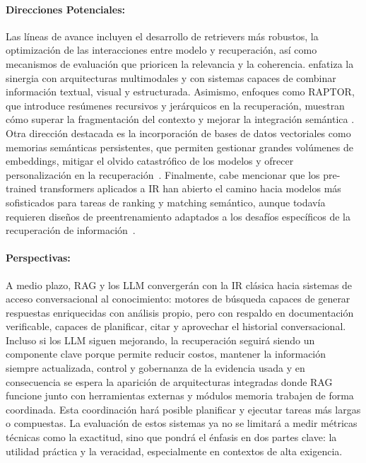 \paragraph{Direcciones Potenciales:}  
Las líneas de avance incluyen el desarrollo de retrievers más robustos, la optimización de las interacciones entre modelo y recuperación, 
así como mecanismos de evaluación que prioricen la relevancia y la coherencia. \textcite{ramdurai2025llm} enfatiza la sinergia con arquitecturas multimodales y con sistemas 
capaces de combinar información textual, visual y estructurada. Asimismo, enfoques como RAPTOR, que introduce resúmenes recursivos y jerárquicos en la recuperación,
muestran cómo superar la fragmentación del contexto y mejorar la integración semántica \parencite{sarthi2024raptor}. Otra dirección destacada es la incorporación de 
bases de datos vectoriales como memorias semánticas persistentes, que permiten gestionar grandes volúmenes de embeddings, mitigar el olvido catastrófico de los modelos
 y ofrecer personalización en la recuperación~\parencite{jing2024vecdb}.
Finalmente, cabe mencionar que los pre-trained transformers aplicados a IR han abierto el camino hacia modelos más sofisticados para tareas de ranking y matching semántico, 
aunque todavía requieren diseños de preentrenamiento adaptados a los desafíos específicos de la recuperación de información~\parencite{fan2021pretraining}.

\paragraph{Perspectivas:}
A medio plazo, RAG y los LLM convergerán con la IR clásica hacia sistemas de acceso conversacional al conocimiento: motores de búsqueda capaces de generar respuestas enriquecidas con análisis propio,
pero con respaldo en documentación verificable, capaces de planificar, citar y aprovechar el historial conversacional. Incluso si los LLM siguen mejorando, la recuperación seguirá 
siendo un componente clave porque permite reducir costos, mantener la información siempre actualizada, control y gobernanza de la evidencia usada y en consecuencia se espera la aparición de arquitecturas integradas donde RAG funcione junto con
herramientas externas y módulos memoria trabajen de forma coordinada. Esta coordinación hará posible planificar y ejecutar tareas más largas o compuestas. La evaluación de estos sistemas ya no se limitará a medir métricas técnicas como la exactitud, sino que pondrá el énfasis en
 dos partes clave: la utilidad práctica y la veracidad, especialmente en contextos de alta exigencia.

